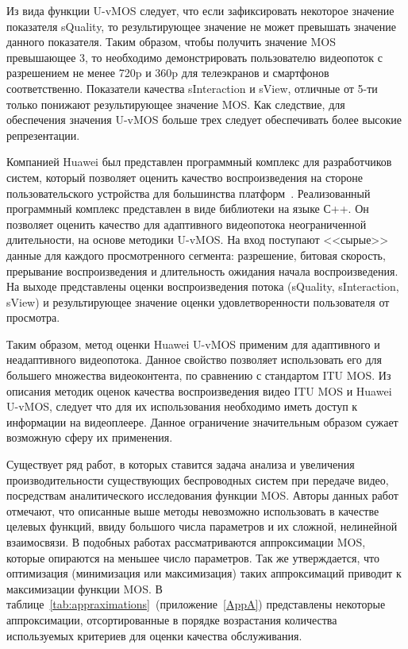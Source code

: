Из вида функции U-vMOS следует, что если зафиксировать некоторое значение показателя sQuality, то результирующее значение не может превышать значение данного показателя. Таким образом, чтобы получить значение MOS превышающее 3, то необходимо демонстрировать пользователю видеопоток с разрешением не менее 720p и 360p для телеэкранов и смартфонов соответственно. Показатели качества sInteraction и sView, отличные от 5-ти только понижают результирующее значение MOS. Как следствие, для обеспечения значения U-vMOS больше трех следует обеспечивать более высокие репрезентации.

Компанией Huawei был представлен программный комплекс для разработчиков систем, который позволяет оценить качество воспроизведения на стороне пользовательского устройства для большинства платформ~\cite{UvMOSSdk}. Реализованный программный комплекс представлен в виде библиотеки на языке С++. Он позволяет оценить качество для адаптивного видеопотока неограниченной длительности, на основе методики U-vMOS. На вход поступают <<сырые>> данные для каждого просмотренного сегмента: разрешение, битовая скорость, прерывание воспроизведения и длительность ожидания начала воспроизведения. На выходе представлены оценки воспроизведения потока (sQuality, sInteraction, sView) и результирующее значение оценки удовлетворенности пользователя от просмотра.

Таким образом, метод оценки Huawei U-vMOS применим для адаптивного и неадаптивного видеопотока. Данное свойство позволяет использовать его для большего множества видеоконтента, по сравнению с стандартом ITU MOS. Из описания методик оценок качества воспроизведения видео ITU MOS и Huawei U-vMOS, следует что для их использования необходимо иметь доступ к информации на видеоплеере. Данное ограничение значительным образом сужает возможную сферу их применения.

Существует ряд работ, в которых ставится задача анализа и увеличения производительности существующих беспроводных систем при передаче видео, посредствам аналитического исследования функции MOS. Авторы данных работ отмечают, что описанные выше методы невозможно использовать в качестве целевых функций, ввиду большого числа параметров и их сложной, нелинейной взаимосвязи. В подобных работах рассматриваются аппроксимации MOS, которые опираются на меньшее число параметров. Так же утверждается, что оптимизация (минимизация или максимизация) таких аппроксимаций приводит к максимизации функции MOS. В таблице~\ref{tab:appraximations}~(приложение~\ref{AppA}) представлены некоторые аппроксимации, отсортированные в порядке возрастания количества используемых критериев для оценки качества обслуживания.

